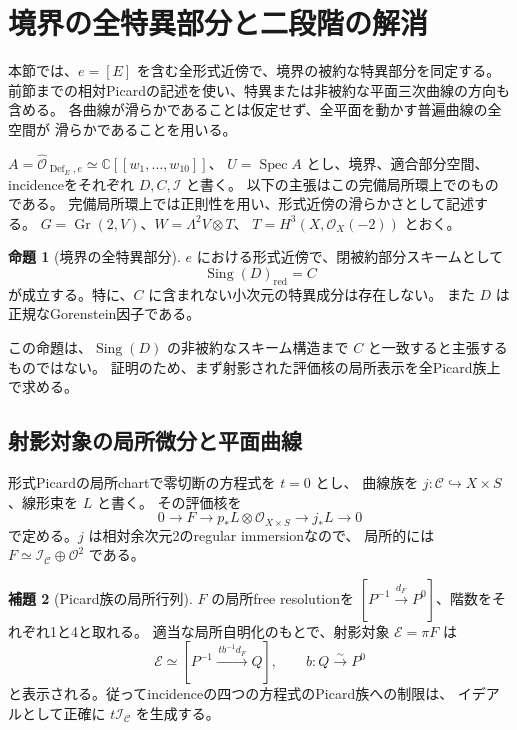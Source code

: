 \documentclass[a4paper,11pt]{ltjsarticle}
\newcommand{\mathscr}{\mathcal}
\theoremstyle{definition}
\newtheorem{theorem}{命題}[section]
\newtheorem{lemma}[theorem]{補題}
\newcommand{\CC}{\mathbb C}
\newcommand{\OO}{\mathcal O}
\newcommand{\Gr}{\operatorname{Gr}}
\newcommand{\Def}{\operatorname{Def}}
\begin{document}
\clearpage
\section{境界の全特異部分と二段階の解消}
\label{sec:global-bn-singular}

本節では、$e=[E]$ を含む全形式近傍で、境界の被約な特異部分を同定する。
前節までの相対Picardの記述を使い、特異または非被約な平面三次曲線の方向も含める。
各曲線が滑らかであることは仮定せず、全平面を動かす普遍曲線の全空間が
滑らかであることを用いる。

$A=\widehat{\OO}_{\Def_E,e}\simeq\CC[[w_1,\ldots,w_{10}]]$、
$U=\operatorname{Spec}A$ とし、境界、適合部分空間、incidenceをそれぞれ
$D,C,\mathcal I$ と書く。
以下の主張はこの完備局所環上でのものである。
完備局所環上では正則性を用い、形式近傍の滑らかさとして記述する。
$G=\Gr(2,V)$、$W=\Lambda^2V\otimes T$、
$T=H^3(X,\OO_X(-2))$ とおく。

\begin{theorem}[境界の全特異部分]\label{thm:global-bn-singular}
$e$ における形式近傍で、閉被約部分スキームとして
\[
 \operatorname{Sing}(D)_{\mathrm{red}}=C
\]
が成立する。特に、$C$ に含まれない小次元の特異成分は存在しない。
また $D$ は正規なGorenstein因子である。
\end{theorem}

この命題は、$\operatorname{Sing}(D)$ の非被約なスキーム構造まで
$C$ と一致すると主張するものではない。
証明のため、まず射影された評価核の局所表示を全Picard族上で求める。

\subsection{射影対象の局所微分と平面曲線}

形式Picardの局所chartで零切断の方程式を $t=0$ とし、
曲線族を $j:\mathscr C\hookrightarrow X\times S$、線形束を $L$ と書く。
その評価核を
\[
 0\longrightarrow F\longrightarrow p_*L\otimes\OO_{X\times S}
 \longrightarrow j_*L\longrightarrow0
\]
で定める。$j$ は相対余次元2のregular immersionなので、
局所的には $F\simeq\mathcal I_{\mathscr C}\oplus\OO^2$ である。

\begin{lemma}[Picard族の局所行列]\label{lem:picard-local-matrix}
$F$ の局所free resolutionを
$[P^{-1}\xrightarrow{d_F}P^0]$、階数をそれぞれ1と4と取れる。
適当な局所自明化のもとで、射影対象 $\mathcal E=\pi F$ は
\begin{equation}\label{eq:picard-local-matrix}
 \mathcal E\simeq
 [P^{-1}\xrightarrow{\,t b^{-1}d_F\,}Q],
 \qquad b:Q\xrightarrow{\sim}P^0
\end{equation}
と表示される。従ってincidenceの四つの方程式のPicard族への制限は、
イデアルとして正確に $t\mathcal I_{\mathscr C}$ を生成する。
\end{lemma}
\end{document}
